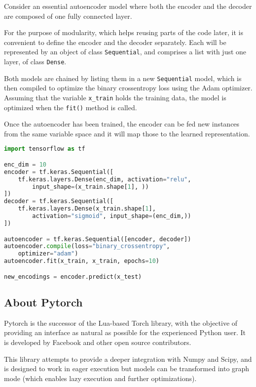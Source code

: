 Consider an essential autoencoder model where both the encoder and the decoder are composed of one fully connected layer. 

For the purpose of modularity, which helps reusing parts of the code later, it is convenient to define the encoder and the decoder separately. Each will be represented by an object of class \texttt{Sequential}, and comprises a list with just one layer, of class \texttt{Dense}. 

Both models are chained by listing them in a new \texttt{Sequential} model, which is then compiled to optimize the binary crossentropy loss using the Adam  optimizer. Assuming that the variable \texttt{x\_train} holds the training data, the model is optimized when the \texttt{fit()} method is called.

Once the autoencoder has been trained, the encoder can be fed new instances from the same variable space and it will map those to the learned representation.

\begin{lstlisting}[language=Python]
import tensorflow as tf

enc_dim = 10
encoder = tf.keras.Sequential([
    tf.keras.layers.Dense(enc_dim, activation="relu", 
        input_shape=(x_train.shape[1], ))
])
decoder = tf.keras.Sequential([
    tf.keras.layers.Dense(x_train.shape[1], 
        activation="sigmoid", input_shape=(enc_dim,))
])

autoencoder = tf.keras.Sequential([encoder, decoder])
autoencoder.compile(loss="binary_crossentropy", 
    optimizer="adam")
autoencoder.fit(x_train, x_train, epochs=10)

new_encodings = encoder.predict(x_test)
\end{lstlisting}

\subsection{About Pytorch}

Pytorch is the successor of the Lua-based Torch library, with the objective of providing an interface as natural as possible for the experienced Python user. It is developed by Facebook and other open source contributors.

This library attempts to provide a deeper integration with Numpy and Scipy, and is designed to work in eager execution but models can be transformed into graph mode (which enables lazy execution and further optimizations).

